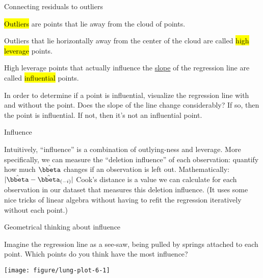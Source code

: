 \documentclass[table]{beamer}\usepackage[]{graphicx}\usepackage[]{color}
\makeatletter
\def\maxwidth{ %
  \ifdim\Gin@nat@width>\linewidth
    \linewidth
  \else
    \Gin@nat@width
  \fi
}
\newenvironment{knitrout}{}{} %
\makeatother
\begin{document}

\begin{frame}{Connecting residuals to outliers}
 
\bi
\myitem \hl{Outliers} are points that lie away from the cloud  of points.

\myitem Outliers that lie horizontally away from the center of the cloud are called \hl{high leverage} points.

\myitem High leverage points that actually influence the \underline{slope} of the regression line are called \hl{influential} points.

\myitem In order to determine if a point is influential, visualize the regression line with and without the point. Does the slope of the line change considerably? If so, then the point is influential. If not, then it's not an influential point.

\ei
\end{frame}


\begin{frame}{Influence}

Intuitively, ``influence'' is a combination of outlying-ness and leverage. More specifically, we can measure the ``deletion influence'' of each observation: quantify how much $\hat\bbeta$ changes if an observation is left out.
\bi
	\myitem Mathematically: $|\hat{\bbeta}- \hat{\bbeta}_{(-i)}|$
	\myitem Cook's distance is a value we can calculate for each observation in our dataset that measures this deletion influence. (It uses some nice tricks of linear algebra without having to refit the regression iteratively without each point.)
\ei

\end{frame}


\begin{frame}[fragile]{Geometrical thinking about influence}

Imagine the regression line as a see-saw, being pulled by springs attached to each point. Which points do you think have the most influence?

\begin{knitrout}\footnotesize
{}\color{fgcolor}
\texttt{[image: figure/lung-plot-6-1]} 

\end{knitrout}

\end{frame}
\end{document}
